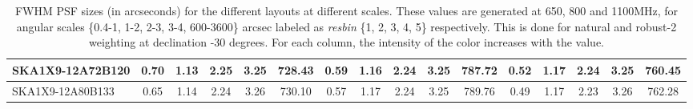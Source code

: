 \begin{table}[htp]
{{\begin{tabular}{|lccccc||ccccc||ccccc|}
SKA1X9-12A72B120 & 0.70 \cellcolor{blue!27.88} & 1.13 \cellcolor{red!18.00} & 2.25 \cellcolor{green!60.00} & 3.25 \cellcolor{orange!25.22} & 728.43 \cellcolor{purple!18.00} & 0.59 \cellcolor{blue!23.48} & 1.16 \cellcolor{red!36.56} & 2.24 \cellcolor{green!22.97} & 3.25 \cellcolor{orange!49.15} & 787.72 \cellcolor{purple!18.00} & 0.52 \cellcolor{blue!35.67} & 1.17 \cellcolor{red!55.05} & 2.24 \cellcolor{green!58.05} & 3.25 \cellcolor{orange!18.00} & 760.45 \cellcolor{purple!45.13}\\ \hline 
SKA1X9-12A80B133 & 0.65 \cellcolor{blue!18.00} & 1.14 \cellcolor{red!20.99} & 2.24 \cellcolor{green!51.69} & 3.26 \cellcolor{orange!60.00} & 730.10 \cellcolor{purple!25.73} & 0.57 \cellcolor{blue!18.00} & 1.17 \cellcolor{red!45.98} & 2.24 \cellcolor{green!60.00} & 3.25 \cellcolor{orange!46.00} & 789.76 \cellcolor{purple!47.00} & 0.49 \cellcolor{blue!18.00} & 1.17 \cellcolor{red!51.12} & 2.23 \cellcolor{green!27.12} & 3.26 \cellcolor{orange!56.33} & 762.28 \cellcolor{purple!60.00}\\ \hline 
\end{tabular}}
\vspace{-0.300000cm}
\hspace{1cm} 

\vspace{.25cm}
\caption{FWHM PSF sizes (in arcseconds) for the different layouts at different scales. These values are generated at 650, 800 and 1100MHz, for angular scales \{0.4-1, 1-2, 2-3, 3-4, 600-3600\} arcsec labeled as {\it resbin} \{1, 2, 3, 4, 5\} respectively. This is done for natural and robust-2 weighting at declination -30 degrees. For each column, the intensity of the color increases with the value.}\label{tab:psf_mean}}
 \end{table}
